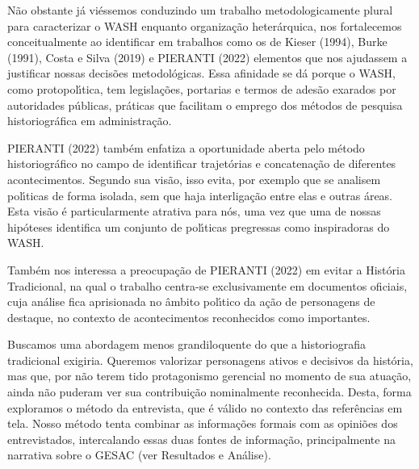 \documentclass[
12pt,		%
openright,	%
twoside,  %
a4paper,			%
chapter=TITLE,		%
english,			%
french,				%
spanish,			%
brazil				%
]{USPSC-classe/USPSC}
\begin{document}
N\~ao obstante j\'a vi\'essemos conduzindo um trabalho metodologicamente plural para caracterizar o WASH enquanto organiza\c{c}\~ao heter\'arquica, nos fortalecemos conceitualmente ao identificar em trabalhos como os de  Kieser (1994),  Burke (1991), Costa e Silva (2019) e PIERANTI (2022) elementos que nos ajudassem a justificar nossas decis\~oes metodol\'ogicas. Essa afinidade se d\'a porque o WASH, como protopol\'{\i}tica, tem legisla\c{c}\~oes, portarias e termos de ades\~ao exarados por autoridades p\'ublicas, pr\'aticas que facilitam o emprego dos m\'etodos de pesquisa historiogr\'afica em administra\c{c}\~ao.








 PIERANTI (2022) tamb\'em enfatiza a oportunidade aberta pelo m\'etodo historiogr\'afico  no campo de identificar trajet\'orias e concatena\c{c}\~ao de diferentes acontecimentos. Segundo sua vis\~ao, \textquotedbl isso evita, por exemplo que se analisem pol\'{\i}ticas de forma isolada, sem que haja interliga\c{c}\~ao entre elas e outras \'areas\textquotedbl . Esta vis\~ao \'e particularmente atrativa para n\'os, uma vez que uma de nossas hip\'oteses identifica um conjunto de pol\'{\i}ticas pregressas como inspiradoras do WASH.








Tamb\'em nos interessa a preocupa\c{c}\~ao de  PIERANTI (2022) em evitar a Hist\'oria Tradicional, na qual o trabalho centra-se exclusivamente em documentos oficiais, cuja an\'alise fica aprisionada no \^ambito pol\'{\i}tico da a\c{c}\~ao de \textquotedbl personagens de destaque\textquotedbl , no contexto de \textquotedbl acontecimentos reconhecidos como importantes\textquotedbl .








Buscamos uma abordagem menos grandiloquente do que a historiografia tradicional exigiria. Queremos valorizar personagens ativos e decisivos da hist\'oria, mas que, por n\~ao terem tido protagonismo gerencial no momento de sua atua\c{c}\~ao, ainda n\~ao puderam ver sua contribui\c{c}\~ao nominalmente reconhecida. Desta, forma exploramos o m\'etodo da entrevista, que \'e v\'alido no contexto das refer\^encias em tela. Nosso m\'etodo tenta combinar as informa\c{c}\~oes formais com as opini\~oes dos entrevistados, intercalando essas duas fontes de informa\c{c}\~ao, principalmente na narrativa sobre o GESAC (ver Resultados e An\'alise).
\end{document}

